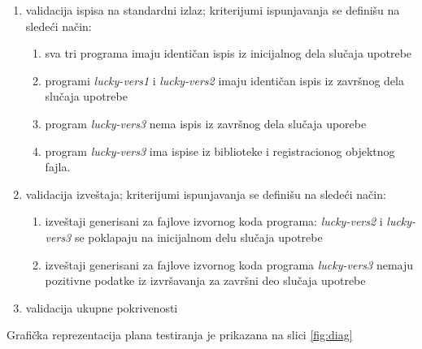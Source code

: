 \documentclass[12pt,oneside]{memoir}
\newcommand{\strano}[1]{\textit{#1}}
\begin{document}
\begin{enumerate}
\begin{enumerate}
\item validacija ispisa na standardni izlaz; kriterijumi ispunjavanja se definišu na sledeći način:
\begin{enumerate}
\item sva tri programa imaju identičan ispis iz inicijalnog dela slučaja upotrebe
\item programi \strano{lucky-vers1} i  \strano{lucky-vers2} imaju identičan ispis iz završnog dela slučaja upotrebe
\item program \strano{lucky-vers3} nema ispis iz završnog dela slučaja uporebe
\item program \strano{lucky-vers3} ima ispise iz biblioteke i registracionog objektnog fajla.
\end{enumerate}
\item validacija izveštaja; kriterijumi ispunjavanja se definišu na sledeći način: 
\begin{enumerate}
\item izveštaji generisani za fajlove izvornog koda programa: \strano{lucky-vers2} i \strano{lucky-vers3} se poklapaju na inicijalnom delu slučaja upotrebe
\item izveštaji generisani za fajlove izvornog koda programa \strano{lucky-vers3} nemaju pozitivne podatke iz izvršavanja za završni deo slučaja upotrebe
\end{enumerate}
\item validacija ukupne pokrivenosti
\end{enumerate}
\end{enumerate}

Grafička reprezentacija plana testiranja je prikazana na slici \ref{fig:diag}
\end{document}
